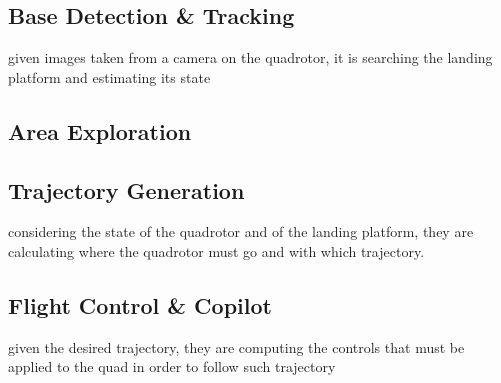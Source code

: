 \subsection{Base Detection \& Tracking}
given images taken from a camera on the quadrotor, it is searching the landing platform and estimating its state

\subsection{Area Exploration} 

\subsection{Trajectory Generation}
considering the state of the quadrotor and of the landing platform, they are calculating where the quadrotor must go and with which trajectory. 

\subsection{Flight Control \& Copilot}
given the desired trajectory, they are computing the controls that must be applied to the quad in order to follow such trajectory
